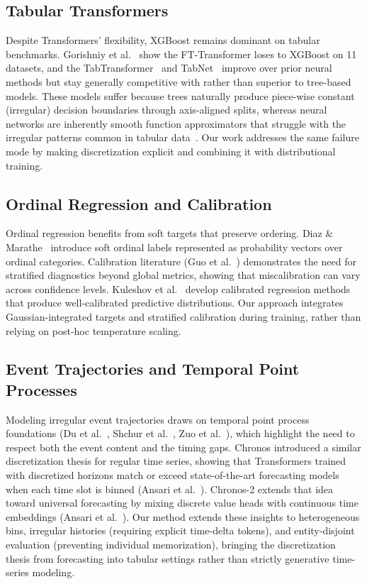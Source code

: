 \documentclass{article}
\begin{document}
\subsection{Tabular Transformers}
Despite Transformers' flexibility, XGBoost remains dominant on tabular benchmarks. Gorishniy et al.~\cite{gorishniy2021revisiting} show the FT-Transformer loses to XGBoost on 11 datasets, and the TabTransformer~\cite{huang2020tabtransformer} and TabNet~\cite{arik2021tabnet} improve over prior neural methods but stay generally competitive with rather than superior to tree-based models. These models suffer because trees naturally produce piece-wise constant (irregular) decision boundaries through axis-aligned splits, whereas neural networks are inherently smooth function approximators that struggle with the irregular patterns common in tabular data~\cite{grinsztajn2022tree,shwartz2022tabular}. Our work addresses the same failure mode by making discretization explicit and combining it with distributional training.
\subsection{Ordinal Regression and Calibration}
Ordinal regression benefits from soft targets that preserve ordering. Diaz \& Marathe~\cite{diaz2019sord} introduce soft ordinal labels represented as probability vectors over ordinal categories. Calibration literature (Guo et al.~\cite{guo2017calibration}) demonstrates the need for stratified diagnostics beyond global metrics, showing that miscalibration can vary across confidence levels. Kuleshov et al.~\cite{kuleshov2018accurate} develop calibrated regression methods that produce well-calibrated predictive distributions. Our approach integrates Gaussian-integrated targets and stratified calibration during training, rather than relying on post-hoc temperature scaling.

\subsection{Event Trajectories and Temporal Point Processes}
Modeling irregular event trajectories draws on temporal point process foundations (Du et al.~\cite{du2016recurrent}, Shchur et al.~\cite{shchur2020intensity}, Zuo et al.~\cite{zuo2020transformer}), which highlight the need to respect both the event content and the timing gaps. Chronos introduced a similar discretization thesis for regular time series, showing that Transformers trained with discretized horizons match or exceed state-of-the-art forecasting models when each time slot is binned (Ansari et al.~\cite{ansari2024chronos}). Chronos-2 extends that idea toward universal forecasting by mixing discrete value heads with continuous time embeddings (Ansari et al.~\cite{ansari2025chronos2}). Our method extends these insights to heterogeneous bins, irregular histories (requiring explicit time-delta tokens), and entity-disjoint evaluation (preventing individual memorization), bringing the discretization thesis from forecasting into tabular settings rather than strictly generative time-series modeling.
\end{document}
